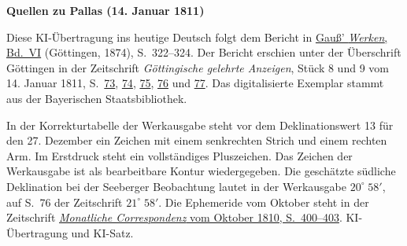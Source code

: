 \clearpage\thispagestyle{empty}
\begin{center}\textbf{Quellen zu Pallas (14. Januar 1811)}\end{center}
\noindent Diese KI-Übertragung ins heutige Deutsch folgt dem Bericht in \href{https://gdz.sub.uni-goettingen.de/id/PPN236007467}{Gauß’ \textit{Werken}, Bd.~VI} (Göttingen, 1874), S.~322--324. Der Bericht erschien unter der Überschrift Göttingen in der Zeitschrift \textit{Göttingische gelehrte Anzeigen}, Stück 8 und 9 vom 14. Januar 1811, S.~\href{https://api.digitale-sammlungen.de/iiif/image/v2/bsb10538679_00109/full/1600,/0/default.jpg}{73}, \href{https://api.digitale-sammlungen.de/iiif/image/v2/bsb10538679_00110/full/1600,/0/default.jpg}{74}, \href{https://api.digitale-sammlungen.de/iiif/image/v2/bsb10538679_00111/full/1600,/0/default.jpg}{75}, \href{https://api.digitale-sammlungen.de/iiif/image/v2/bsb10538679_00112/full/1600,/0/default.jpg}{76} und \href{https://api.digitale-sammlungen.de/iiif/image/v2/bsb10538679_00113/full/1600,/0/default.jpg}{77}. Das digitalisierte Exemplar stammt aus der Bayerischen Staatsbibliothek.
\par\smallskip\noindent In der Korrekturtabelle der Werkausgabe steht vor dem Deklinationswert 13 für den 27. Dezember ein Zeichen mit einem senkrechten Strich und einem rechten Arm. Im Erstdruck steht ein vollständiges Pluszeichen. Das Zeichen der Werkausgabe ist als bearbeitbare Kontur wiedergegeben. Die geschätzte südliche Deklination bei der Seeberger Beobachtung lautet in der Werkausgabe $20^\circ\;58'$, auf S.~76 der Zeitschrift $21^\circ\;58'$. Die Ephemeride vom Oktober steht in der Zeitschrift \href{https://archive.org/download/bub_gb_YCI4AAAAMAAJ/page/n403.jpg}{\textit{Monatliche Correspondenz} vom Oktober 1810, S.~400--403}. KI-Übertragung und KI-Satz.
\clearpage
